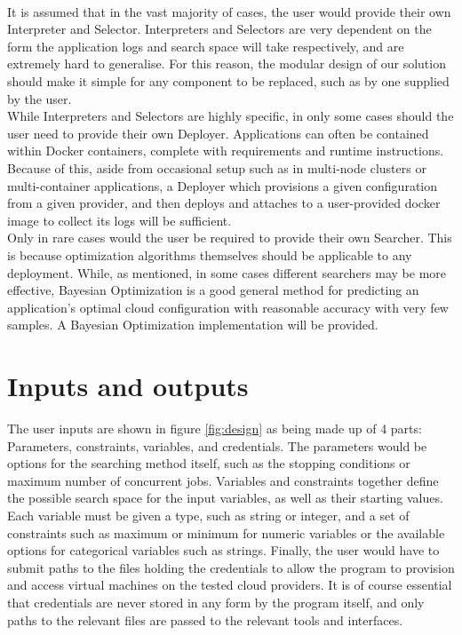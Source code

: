 \documentclass{report}
\begin{document}
\paragraph{}
It is assumed that in the vast majority of cases, the user would provide their own Interpreter and Selector. Interpreters and Selectors are very dependent on the form the application logs and search space will take respectively, and are extremely hard to generalise. For this reason, the modular design of our solution should make it simple for any component to be replaced, such as by one supplied by the user.  \\
While Interpreters and Selectors are highly specific, in only some cases should the user need to provide their own Deployer. Applications can often be contained within Docker containers, complete with requirements and runtime instructions. Because of this, aside from occasional setup such as in multi-node clusters or multi-container applications, a Deployer which provisions a given configuration from a given provider, and then deploys and attaches to a user-provided docker image to collect its logs will be sufficient.  \\
Only in rare cases would the user be required to provide their own Searcher. This is because optimization algorithms themselves should be applicable to any deployment. While, as mentioned, in some cases different searchers may be more effective, Bayesian Optimization is a good general method for predicting an application's optimal cloud configuration with reasonable accuracy with very few samples. A Bayesian Optimization implementation will be provided.


\section{Inputs and outputs}
The user inputs are shown in figure \ref{fig:design} as being made up of 4 parts: Parameters, constraints, variables, and credentials. The parameters would be options for the searching method itself, such as the stopping conditions or maximum number of concurrent jobs. Variables and constraints together define the possible search space for the input variables, as well as their starting values. Each variable must be given a type, such as string or integer, and a set of constraints such as maximum or minimum for numeric variables or the available options for categorical variables such as strings. Finally, the user would have to submit paths to the files holding the credentials to allow the program to provision and access virtual machines on the tested cloud providers. It is of course essential that credentials are never stored in any form by the program itself, and only paths to the relevant files are passed to the relevant tools and interfaces.
\end{document}
